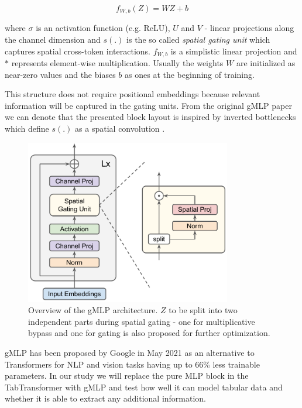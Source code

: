 \documentclass{article}
\begin{document}
\begin{equation}
    f_{W,b}(Z) = WZ + b
\end{equation}

where $\sigma$ is an activation function (e.g. ReLU), $U$ and $V$ - linear projections along the channel dimension and $s(.)$ is the so called \textit{spatial gating unit} which captures spatial cross-token interactions. $f_{W,b}$ is a simplistic linear projection and $*$ represents element-wise multiplication. Usually the weights $W$ are initialized as near-zero values and the biases $b$ as ones at the beginning of training.

This structure does not require positional embeddings because relevant information will be captured in the gating units. From the original gMLP paper we can denote that the presented block layout is inspired by inverted bottlenecks which define $s(.)$ as a spatial convolution \cite{sandler2018mobilenetv2}.

\begin{figure}[hpt]
    \begin{center}
      \includegraphics[width=9cm]{gmlp-overview.pdf}
      \caption{Overview of the gMLP architecture. $Z$ to be split into two independent parts during spatial gating - one for multiplicative bypass and one for gating is also proposed for further optimization.}
    \end{center}

    \label{fig:gmlp-overview}
\end{figure}

gMLP has been proposed by Google in May 2021 as an alternative to Transformers for NLP and vision tasks having up to 66\% less trainable parameters. In our study we will replace the pure MLP block in the TabTransformer with gMLP and test how well it can model tabular data and whether it is able to extract any additional information.
\end{document}
